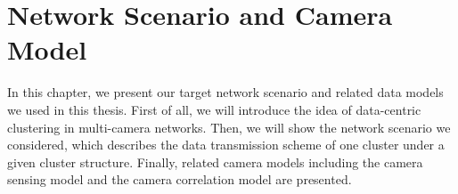 \section{Network Scenario and Camera Model}
\label{sec::scenarioAndModel}
In this chapter, we present our target network scenario and related data models we used in this thesis.
First of all, we will introduce the idea of data-centric clustering in multi-camera networks.
Then, we will show the network scenario we considered, which describes the data transmission scheme of one cluster under a given cluster structure.
Finally, related camera models including the camera sensing model and the camera correlation model are presented.


